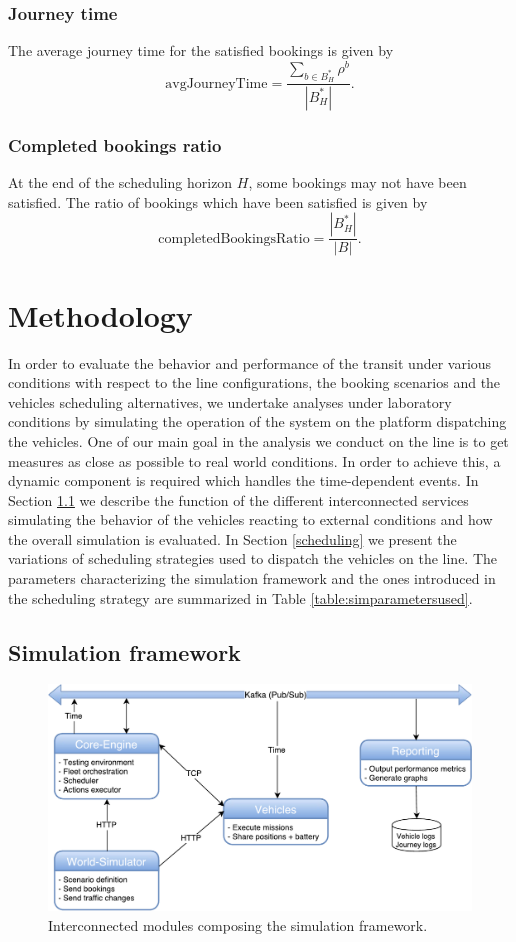\documentclass[12pt,a4paper]{article}
\begin{document}
\subsubsection{Journey time}
The average journey time for the satisfied bookings is given by
$$\text{avgJourneyTime} = \frac{\sum_{b \in B^{*}_{H}}\rho^{b}}{|B^{*}_{H}|}.$$

\subsubsection{Completed bookings ratio}
At the end of the scheduling horizon $H$, some bookings may not have been satisfied. The ratio of bookings which have been satisfied is given by
$$\text{completedBookingsRatio} = \frac{|B^{*}_{H}|}{|B|}.$$

\section{Methodology}
In order to evaluate the behavior and performance of the transit under various conditions with respect to the line configurations, the booking scenarios and the vehicles scheduling alternatives, we undertake analyses under laboratory conditions by simulating the operation of the system on the platform dispatching the vehicles. One of our main goal in the analysis we conduct on the line is to get measures as close as possible to real world conditions. In order to achieve this, a dynamic component is required which handles the time-dependent events. In Section \ref{framework} we describe the function of the different interconnected services simulating the behavior of the vehicles reacting to external conditions and how the overall simulation is evaluated. In Section \ref{scheduling} we present the variations of scheduling strategies used to dispatch the vehicles on the line. The parameters characterizing the simulation framework and the ones introduced in the scheduling strategy are summarized in Table \ref{table:simparametersused}. 

\subsection{Simulation framework}\label{framework}
\setlength{\belowcaptionskip}{10pt}
\begin{figure} 
  \centering
\includegraphics[scale=0.55]{./images/SimulationFramework2.pdf}
\caption{Interconnected modules composing the simulation framework.}
\label{fig:simulationFramework}
\end{figure}
\end{document}
